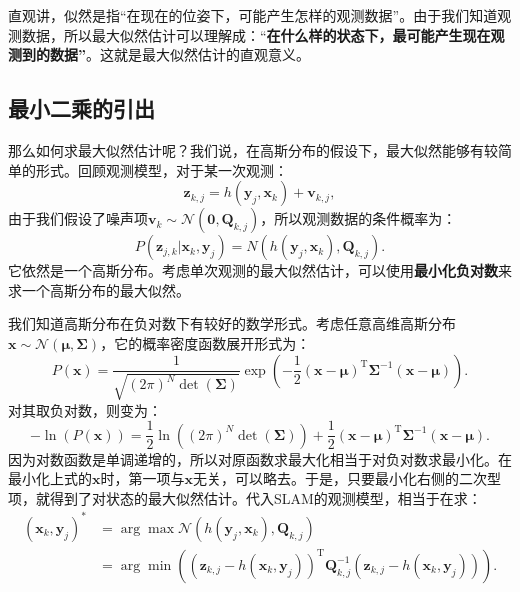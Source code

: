 直观讲，似然是指“在现在的位姿下，可能产生怎样的观测数据”。由于我们知道观测数据，所以最大似然估计可以理解成：“\textbf{在什么样的状态下，最可能产生现在观测到的数据”}。这就是最大似然估计的直观意义。

\subsection{最小二乘的引出}
那么如何求最大似然估计呢？我们说，在高斯分布的假设下，最大似然能够有较简单的形式。回顾观测模型，对于某一次观测：
\[
{\bm{z}_{k,j}} = h\left( {{ \bm{y}_j},{ \bm{x}_k}}  \right)+ \bm{v}_{k,j},
\]
由于我们假设了噪声项${\bm{v}_k} \sim \mathcal{N}\left( {\bm{0},{{{\bm{Q}}}_{k,j}}} \right)$，所以观测数据的条件概率为：
\[
P( \bm{z}_{j,k} | \bm{x}_k, \bm{y}_j ) = N\left( h(\bm{y}_j, \bm{x}_k), \bm{Q}_{k,j} \right).
\]
它依然是一个高斯分布。考虑单次观测的最大似然估计，可以使用\textbf{最小化负对数}来求一个高斯分布的最大似然。

我们知道高斯分布在负对数下有较好的数学形式。考虑任意高维高斯分布$\bm{x} \sim \mathcal{N}(\bm{\mu}, \bm{\Sigma})$，它的概率密度函数展开形式为：
\begin{equation}
P\left( \bm{x} \right) = \frac{1}{{\sqrt {{{(2\pi )}^N}\det ( \bm{\Sigma} )} }}\exp \left( { - \frac{1}{2}{{\left( { \bm{x} - \bm{\mu} } \right)}^\mathrm{T}}{ \bm{\Sigma} ^{ - 1}}\left( { \bm{x} - \bm{\mu} } \right)} \right).
\end{equation}
对其取负对数，则变为：
\begin{equation}
- \ln \left( {P\left( \bm{x} \right)} \right) = \frac{1}{2}\ln \left( {{{\left( {2\pi } \right)}^N}\det \left( \bm{\Sigma}  \right)} \right) + \frac{1}{2}{\left( { \bm{x} - \bm{\mu} } \right)^\mathrm{T}}{\bm{\Sigma} ^{ - 1}}\left( {\bm{x} - \bm{\mu} } \right).
\end{equation}
因为对数函数是单调递增的，所以对原函数求最大化相当于对负对数求最小化。在最小化上式的$\bm{x}$时，第一项与$\bm{x}$无关，可以略去。于是，只要最小化右侧的二次型项，就得到了对状态的最大似然估计。代入SLAM的观测模型，相当于在求：
\begin{equation}
\begin{aligned}
(\bm{x}_k,\bm{y}_j)^* &= \arg \max \mathcal{N}(h(\bm{y}_j, \bm{x}_k), \bm{Q}_{k,j}) \\ &=  \arg \min \left( {{{\left( {{ \bm{z}_{k,j}} - h\left( {{\bm{x}_k},{\bm{y}_j}} \right)} \right)}^\mathrm{T}} \bm{Q}_{k,j}^{ - 1}\left( {{\bm{z}_{k,j}} - h\left( {{\bm{x}_k},{\bm{y}_j}} \right)} \right)} \right).
\end{aligned}
\end{equation}


